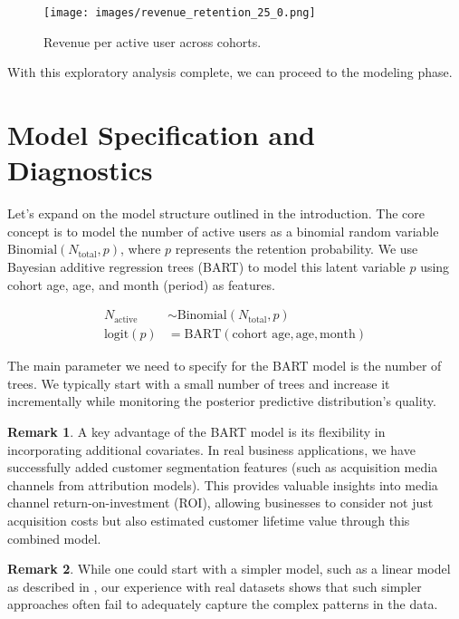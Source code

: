 \documentclass[11pt]{amsart}
\theoremstyle{definition}
\newtheorem{remark}{Remark}
\begin{document}
\begin{figure}
    \centering
    \texttt{[image: images/revenue\_retention\_25\_0.png]}
    \caption{Revenue per active user across cohorts.}
    \label{fig:revenue_per_active_user}
\end{figure}

With this exploratory analysis complete, we can proceed to the modeling phase.

\section{Model Specification and Diagnostics}

Let's expand on the model structure outlined in the introduction. The core concept is to model the number of active users as
a binomial random variable $\text{Binomial}(N_{\text{total}}, p)$, where $p$ represents the retention probability.
We use Bayesian additive regression trees (BART) to model this latent variable $p$ using cohort age, age, and month (period)
as features.

\begin{align*}
    N_{\text{active}} & \sim \text{Binomial}(N_{\text{total}}, p)                  \\
    \textrm{logit}(p) & = \text{BART}(\text{cohort age}, \text{age}, \text{month})
\end{align*}

The main parameter we need to specify for the BART model is the number of trees. We typically start with a small number of
trees and increase it incrementally while monitoring the posterior predictive distribution's quality.

\begin{remark}
    A key advantage of the BART model is its flexibility in incorporating additional covariates. In real business
    applications, we have successfully added customer segmentation features (such as acquisition media channels from
    attribution models). This provides valuable insights into media channel return-on-investment (ROI), allowing businesses
    to consider not just acquisition costs but also estimated customer lifetime value through this combined model.
\end{remark}

\begin{remark}
    While one could start with a simpler model, such as a linear model as described in \cite{orduz_revenue_retention},
    our experience with real datasets shows that such simpler approaches often fail to adequately capture the complex
    patterns in the data.
\end{remark}
\end{document}
